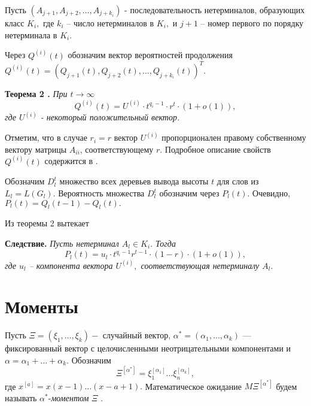 \documentclass[%
11pt,a4paper]{article}
\begin{document}
{{Пусть $\left(A_{j+1},A_{j+2},\ldots,A_{j+k_i}\right)$ - последовательность нетерминалов, образующих класс $K_i,$ где $k_i$ -- число нетерминалов в $K_i,$ и $j+1$ -- номер первого по порядку нетерминала в $K_i.$

Через $Q^{(i)}(t)$ обозначим вектор вероятностей продолжения $Q^{(i)}(t)=\left(Q_{j+1}(t),Q_{j+2}(t), \ldots,Q_{j+k_i}(t)\right)^{T}.$

\medskip

\textbf{Теорема 2 \cite{zhil4}.}
{\em
При $t \rightarrow \infty$
$$
Q^{(i)}(t)=U^{(i)} \cdot t^{q_i-1}\cdot r^t \cdot (1+o(1)),
$$ 
где $U^{(i)}$ - некоторый положительный вектор. 
}

\medskip

Отметим, что в случае $r_i =r$ вектор $U^{(i)}$ пропорционален правому собственному вектору матрицы $A_{ii}$, соответствующему $r.$ Подробное описание свойств $Q^{(i)}(t)$ содержится в \cite{zhil4}.
\medskip

Обозначим $D_l^t$ множество всех деревьев вывода высоты $t$ для слов из $L_l=L(G_l).$ Вероятность множества $D_l^t$ обозначим через $P_l(t).$ Очевидно, $P_l(t)=Q_l(t-1)-Q_l(t).$

Из теоремы 2 вытекает
\medskip

\textbf{Следствие.}
{\em
Пусть нетерминал $A_l \in K_i.$ Тогда
\begin{equation}
P_l(t)=u_l \cdot t^{q_i-1}r^{t-1}\cdot (1-r)\cdot (1+o(1)),
\label{24}
\end{equation}
где $u_l$ -- компонента вектора $U^{(i)},$ соответствующая нетерминалу $A_l.$}

\medskip
\section{Моменты}
\medskip

{\sloppy
Пусть $\Xi=(\xi_1,\ldots,\xi_k) -$ случайный вектор,
$\alpha^*=(\alpha_1, \ldots,\alpha_k )$ --- фиксированный вектор
с целочисленными неотрицательными компонентами и
$\alpha=\alpha_1+\ldots+\alpha_k.$ Обозначим
$$
\Xi^{[\alpha^*]}=\xi_1^{[\alpha_1]} \ldots \xi_n^{[\alpha_k]},
$$
где $x^{[a]}=x(x-1)\ldots (x-a+1).$
Математическое ожидание $M\Xi^{[\alpha^*]}$ будем называть $\alpha^*$-{\em моментом\/} $\Xi$ \cite{sev}.


}}}
\end{document}
